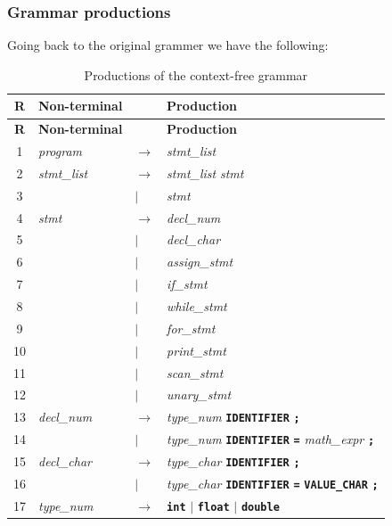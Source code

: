 \documentclass[letterpaper,12pt,oneside]{article}
\begin{document}
\subsubsection{Grammar productions}

Going back to the original grammer we have the following:

\begin{longtable}{c p{2.8cm} p{0.5cm} p{9cm}}
\caption{Productions of the context-free grammar} \\
\hline
\rowcolor{gray!20}
\textbf{R} & \textbf{Non-terminal} & & \textbf{Production} \\
\hline
\endfirsthead
\hline
\rowcolor{gray!20}
\textbf{R} & \textbf{Non-terminal} & & \textbf{Production} \\
\hline
\endhead

1 & \textit{program} & $\rightarrow$ & \textit{stmt\_list} \\[4pt]
2 & \textit{stmt\_list} & $\rightarrow$ & \textit{stmt\_list} \; \textit{stmt} \\
3 & & $|$ & \textit{stmt} \\[4pt]
4 & \textit{stmt} & $\rightarrow$ & \textit{decl\_num} \\
5 & & $|$ & \textit{decl\_char} \\
6 & & $|$ & \textit{assign\_stmt} \\
7 & & $|$ & \textit{if\_stmt} \\
8 & & $|$ & \textit{while\_stmt} \\
9 & & $|$ & \textit{for\_stmt} \\
10 & & $|$ & \textit{print\_stmt} \\
11 & & $|$ & \textit{scan\_stmt} \\
12 & & $|$ & \textit{unary\_stmt} \\[4pt]
13 & \textit{decl\_num} & $\rightarrow$ & \textit{type\_num} \; \textbf{\texttt{IDENTIFIER}} \; \textbf{\texttt{;}} \\
14 & & $|$ & \textit{type\_num} \; \textbf{\texttt{IDENTIFIER}} \; \textbf{\texttt{=}} \; \textit{math\_expr} \; \textbf{\texttt{;}} \\[4pt]
15 & \textit{decl\_char} & $\rightarrow$ & \textit{type\_char} \; \textbf{\texttt{IDENTIFIER}} \; \textbf{\texttt{;}} \\
16 & & $|$ & \textit{type\_char} \; \textbf{\texttt{IDENTIFIER}} \; \textbf{\texttt{=}} \; \textbf{\texttt{VALUE\_CHAR}} \; \textbf{\texttt{;}} \\[4pt]
17 & \textit{type\_num} & $\rightarrow$ & \textbf{\texttt{int}} \; $|$ \; \textbf{\texttt{float}} \; $|$ \; \textbf{\texttt{double}} \\[4pt]

\end{longtable}
\end{document}
